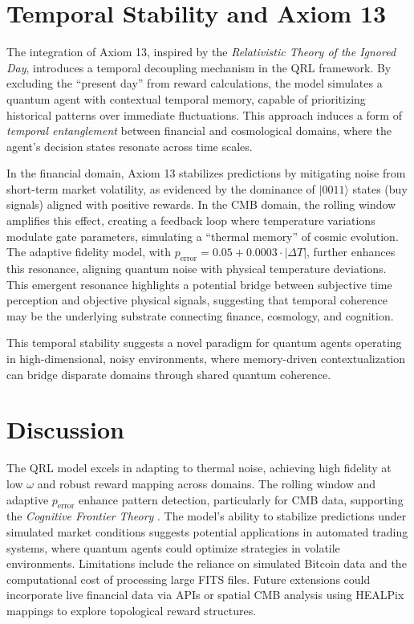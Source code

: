 \documentclass{article}
\begin{document}
\section{Temporal Stability and Axiom 13}
The integration of Axiom 13, inspired by the \emph{Relativistic Theory of the Ignored Day}, introduces a temporal decoupling mechanism in the QRL framework. By excluding the ``present day'' from reward calculations, the model simulates a quantum agent with contextual temporal memory, capable of prioritizing historical patterns over immediate fluctuations. This approach induces a form of \emph{temporal entanglement} between financial and cosmological domains, where the agent's decision states resonate across time scales.

In the financial domain, Axiom 13 stabilizes predictions by mitigating noise from short-term market volatility, as evidenced by the dominance of $|0011\rangle$ states (buy signals) aligned with positive rewards. In the CMB domain, the rolling window amplifies this effect, creating a feedback loop where temperature variations modulate gate parameters, simulating a ``thermal memory'' of cosmic evolution. The adaptive fidelity model, with $p_{\text{error}} = 0.05 + 0.0003 \cdot |\Delta T|$, further enhances this resonance, aligning quantum noise with physical temperature deviations. This emergent resonance highlights a potential bridge between subjective time perception and objective physical signals, suggesting that temporal coherence may be the underlying substrate connecting finance, cosmology, and cognition.

This temporal stability suggests a novel paradigm for quantum agents operating in high-dimensional, noisy environments, where memory-driven contextualization can bridge disparate domains through shared quantum coherence.

\section{Discussion}
The QRL model excels in adapting to thermal noise, achieving high fidelity at low $\omega$ and robust reward mapping across domains. The rolling window and adaptive $p_{\text{error}}$ enhance pattern detection, particularly for CMB data, supporting the \emph{Cognitive Frontier Theory} \cite{PlanckLegacy}. The model’s ability to stabilize predictions under simulated market conditions suggests potential applications in automated trading systems, where quantum agents could optimize strategies in volatile environments. Limitations include the reliance on simulated Bitcoin data and the computational cost of processing large FITS files. Future extensions could incorporate live financial data via APIs or spatial CMB analysis using HEALPix mappings to explore topological reward structures.
\end{document}

